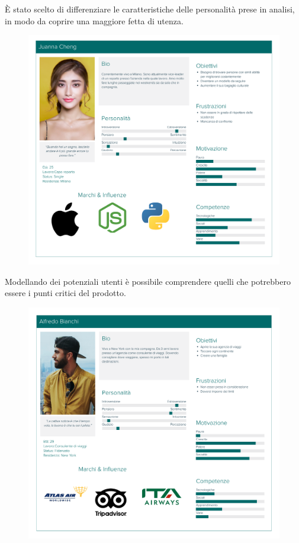 \documentclass{natourDoc}
\begin{document}
È stato scelto di differenziare le caratteristiche delle personalità prese in analisi, in modo da coprire una maggiore fetta di utenza.
\begin{figure}[!htbp]
	\centering
	\includegraphics[width=\textwidth]{./personas/personas-cheng.pdf}
\end{figure}

\newpage
Modellando dei potenziali utenti è possibile comprendere quelli che potrebbero essere i punti critici del prodotto.
\begin{figure}[!htbp]
	\centering
	\includegraphics[width=\textwidth]{./personas/personas-bianchi.pdf}
\end{figure}
\end{document}
